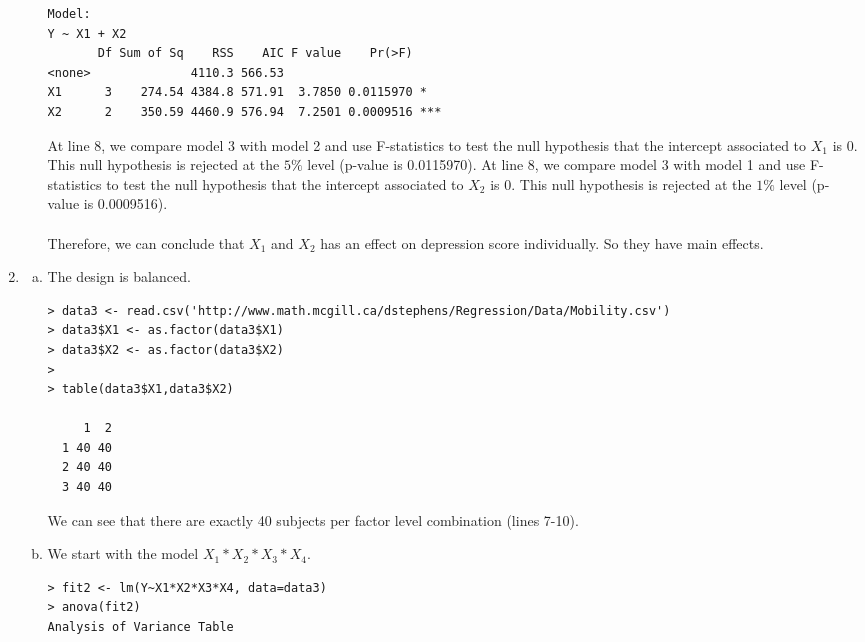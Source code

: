 \documentclass[10pt]{article}
\begin{document}
\begin{enumerate}
\begin{enumerate}[(a)]
\begin{lstlisting}
Model:
Y ~ X1 + X2
       Df Sum of Sq    RSS    AIC F value    Pr(>F)    
<none>              4110.3 566.53                      
X1      3    274.54 4384.8 571.91  3.7850 0.0115970 *  
X2      2    350.59 4460.9 576.94  7.2501 0.0009516 ***
		 \end{lstlisting}
		 At line 8, we compare model 3 with model 2 and use F-statistics to test the null hypothesis that the intercept associated to $X_1$ is 0. This null hypothesis is rejected at the $5\%$ level (p-value is 0.0115970). 
		 At line 8, we compare model 3 with model 1 and use F-statistics to test the null hypothesis that the intercept associated to $X_2$ is 0. This null hypothesis is rejected at the $1\%$ level (p-value is 0.0009516). 
		 \\\\
Therefore, we can conclude that $X_1$ and $X_2$ has an effect on depression score individually. So they have main effects. 
	\end{enumerate}
	\item \begin{enumerate}[a)]
		\item The design is balanced. 
		\begin{lstlisting}
> data3 <- read.csv('http://www.math.mcgill.ca/dstephens/Regression/Data/Mobility.csv')
> data3$X1 <- as.factor(data3$X1)
> data3$X2 <- as.factor(data3$X2)
> 
> table(data3$X1,data3$X2)
   
     1  2
  1 40 40
  2 40 40
  3 40 40

		\end{lstlisting}
		We can see that there are exactly 40 subjects per factor level combination (lines 7-10). %


  
		\item We start with the model $X_1*X_2*X_3*X_4$.
		\begin{lstlisting}
> fit2 <- lm(Y~X1*X2*X3*X4, data=data3)
> anova(fit2)
Analysis of Variance Table


\end{lstlisting}
\end{enumerate}
\end{enumerate}
\end{document}
